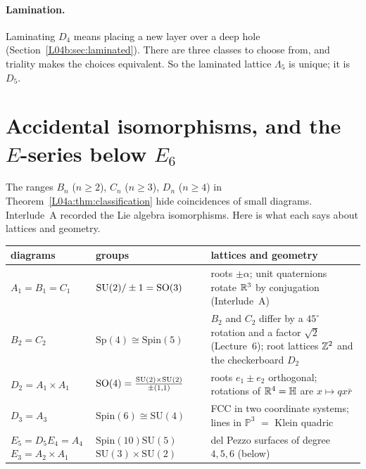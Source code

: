 \paragraph{Lamination.} Laminating $D_4$ means placing a new layer over a deep hole
(Section~\ref{L04b:sec:laminated}). There are three classes to choose from, and triality makes the choices
equivalent. So the laminated lattice $\Lambda_5$ is unique; it is $D_5$.

\section[Accidental isomorphisms and the $E$-series]{Accidental isomorphisms, and the \texorpdfstring{$E$}{E}-series below \texorpdfstring{$E_6$}{E6}}
\label{DYN:sec:accidents}

The ranges $B_n$ ($n\ge2$), $C_n$ ($n\ge3$), $D_n$ ($n\ge4$) in Theorem~\ref{L04a:thm:classification} hide
coincidences of small diagrams. Interlude~A recorded the Lie algebra isomorphisms. Here is what each says
about lattices and geometry.
\begin{center}
\renewcommand{\arraystretch}{1.25}
\small
\begin{tabular}{p{}p{}p{}}
\toprule
diagrams & groups & lattices and geometry\\
\midrule
$A_1=B_1=C_1$ & $\mathrm{SU}(2)/\pm1=\mathrm{SO}(3)$ & roots $\pm\alpha$; unit quaternions rotate $\mathbb{R}^3$ by conjugation (Interlude~A)\\
$B_2=C_2$ & $\mathrm{Sp}(4)\cong\mathrm{Spin}(5)$ & $B_2$ and $C_2$ differ by a $45^\circ$ rotation and a factor $\sqrt2$ (Lecture~6); root lattices $\mathbb{Z}^2$ and the checkerboard $D_2$\\
$D_2=A_1\times A_1$ & $\mathrm{SO}(4)=\frac{\mathrm{SU}(2)\times\mathrm{SU}(2)}{\pm(1,1)}$ & roots $e_1\pm e_2$ orthogonal; rotations of $\mathbb{R}^4=\mathbb H$ are $x\mapsto qx\bar r$\\
$D_3=A_3$ & $\mathrm{Spin}(6)\cong\mathrm{SU}(4)$ & FCC in two coordinate systems; lines in $\mathbb P^3$ $=$ Klein quadric\\
$E_5=D_5$\newline $E_4=A_4$\newline $E_3=A_2\times A_1$ & $\mathrm{Spin}(10)$\newline $\mathrm{SU}(5)$\newline $\mathrm{SU}(3)\times\mathrm{SU}(2)$ & del Pezzo surfaces of degree $4,5,6$ (below)\\
\bottomrule
\end{tabular}
\end{center}

